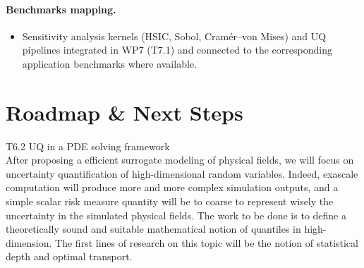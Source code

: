 \paragraph{Benchmarks mapping.}
\begin{itemize}
	\item Sensitivity analysis kernels (HSIC, Sobol, Cramér–von Mises) and UQ pipelines integrated in WP7 (T7.1) and connected to the corresponding application benchmarks where available.
\end{itemize}



\section{Roadmap \& Next Steps}

T6.2 UQ in a PDE solving framework \\ 
After proposing a efficient surrogate modeling of physical fields, we will focus on uncertainty quantification of high-dimensional random variables. Indeed, exascale computation will produce more and more complex simulation outputs, and a simple scalar risk measure quantity will be to coarse to represent wisely the uncertainty in the simulated physical fields. The work to be done is to define a theoretically sound and suitable mathematical notion of quantiles in high-dimension. The first lines of research on this topic will be the notion of statistical depth and optimal transport. 

